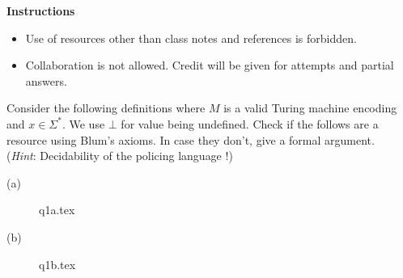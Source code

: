 \documentclass[12pt, a4paper,answers]{exam}
\begin{document}
\textbf{Instructions}
\begin{itemize}   \setlength\itemsep{0.1mm}
	\item {\sf  Use of resources other than class notes and references is forbidden.}
	\item {\sf Collaboration is not allowed. Credit will be given for attempts and partial answers.}
\end{itemize}


\begin{questions}


Consider the following definitions where $M$ is a valid Turing machine encoding and $x \in \Sigma^*$. We use $\bot$ for value being undefined. Check if the follows are a resource using Blum's axioms. In case they don't, give a formal argument. \\ (\textit{Hint}: Decidability of the policing language !)
\begin{solution}
    \begin{description}
        \item[(a)] {q1a.tex}
        \item[(b)] {q1b.tex}
    \end{description}
\end{solution}


\end{questions}
\end{document}
